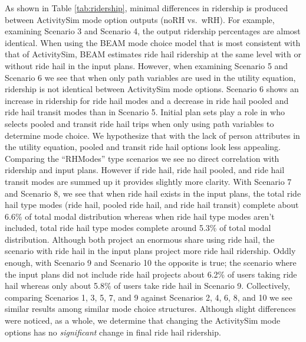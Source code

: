 \documentclass[12pt, oneside, openright]{byuthesis}
\begin{document}
As shown in Table \ref{tab:ridership}, minimal differences in ridership is produced between ActivitySim mode option outputs (noRH vs.~wRH). For example, examining Scenario 3 and Scenario 4, the output ridership percentages are almost identical. When using the BEAM mode choice model that is most consistent with that of ActivitySim, BEAM estimates ride hail ridership at the same level with or without ride hail in the input plans. However, when examining Scenario 5 and Scenario 6 we see that when only path variables are used in the utility equation, ridership is not identical between ActivitySim mode options. Scenario 6 shows an increase in ridership for ride hail modes and a decrease in ride hail pooled and ride hail transit modes than in Scenario 5. Initial plan sets play a role in who selects pooled and transit ride hail trips when only using path variables to determine mode choice. We hypothesize that with the lack of person attributes in the utility equation, pooled and transit ride hail options look less appealing. Comparing the ``RHModes'' type scenarios we see no direct correlation with ridership and input plans. However if ride hail, ride hail pooled, and ride hail transit modes are summed up it provides slightly more clarity. With Scenario 7 and Scenario 8, we see that when ride hail exists in the input plans, the total ride hail type modes (ride hail, pooled ride hail, and ride hail transit) complete about 6.6\% of total modal distribution whereas when ride hail type modes aren't included, total ride hail type modes complete around 5.3\% of total modal distribution. Although both project an enormous share using ride hail, the scenario with ride hail in the input plans project more ride hail ridership. Oddly enough, with Scenario 9 and Scenario 10 the opposite is true; the scenario where the input plans did not include ride hail projects about 6.2\% of users taking ride hail whereas only about 5.8\% of users take ride hail in Scenario 9. Collectively, comparing Scenarios 1, 3, 5, 7, and 9 against Scenarios 2, 4, 6, 8, and 10 we see similar results among similar mode choice structures. Although slight differences were noticed, as a whole, we determine that changing the ActivitySim mode options has no \emph{significant} change in final ride hail ridership.
\end{document}
